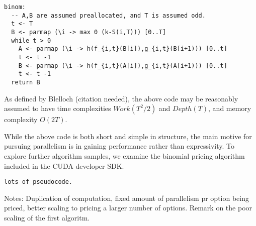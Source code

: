\begin{verbatim}
binom:
  -- A,B are assumed preallocated, and T is assumed odd.
  t <- T
  B <- parmap (\i -> max 0 (k-S(i,T))) [0..T]
  while t > 0
    A <- parmap (\i -> h(f_{i,t}(B[i]),g_{i,t}(B[i+1))) [0..t]
    t <- t -1
    B <- parmap (\i -> h(f_{i,t}(A[i]),g_{i,t}(A[i+1))) [0..t]
    t <- t -1
  return B
\end{verbatim}

 As defined by Blelloch (citation needed), the above code
may be reasonably assumed to have time complexities $Work(T^2/2)$ and
$Depth(T)$, and memory complexity $O(2T)$.

While the above code is both short and simple in structure, the main motive for
pursuing parallelism is in gaining performance rather than expressivity.  To
explore further algorithm samples, we examine the binomial pricing algorithm
included in the CUDA developer SDK.

\begin{verbatim}
lots of pseudocode.
\end{verbatim}

Notes: Duplication of computation, fixed amount of parallelism pr option being
priced, better scaling to pricing a larger number of options. Remark on the
poor scaling of the first algoritm.
